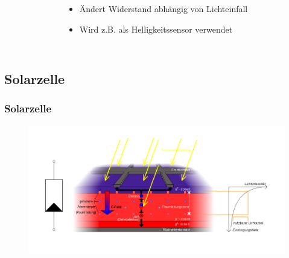 \begin{frame}
\begin{columns}[c]
\begin{center}
\begin{figure}
      \end{figure}
    \end{center}
    \begin{itemize}
      \item Ändert Widerstand abhängig von Lichteinfall
      \item Wird z.B. als Helligkeitssensor verwendet
    \end{itemize}
  \end{columns}
\end{frame}

\subsection*{Solarzelle}
\begin{frame}
  \frametitle{Solarzelle}
  \begin{center}
    \begin{figure}
      \includegraphics[width=1\textwidth,height=.75\textheight,keepaspectratio]{a05/Solarzelle_Funktionsprinzip2.png}
    \end{figure}
  \end{center}
\end{frame}


